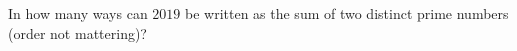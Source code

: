 In how many ways can $2019$ be written as the sum of two distinct prime numbers (order not mattering)?
